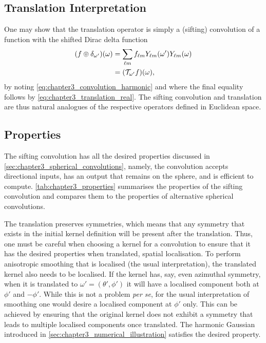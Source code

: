 \subsection{Translation Interpretation}\label{sec:chapter3_translation_interpretation}

One may show that the translation operator is simply a (sifting) convolution of a function with the shifted Dirac delta function
%
\begin{align}
	\pixel{\convolution{f}{\delta_{\omega'}}}
	 & = \harmonicSum \harmonic{f} \pixel[']{\harmonic{Y}} \pixel{\harmonic{Y}} \nonumber{} \\
	 & = \pixel{(\translation{\omega'}f)},
\end{align}
%
by noting \cref{eq:chapter3_convolution_harmonic} and where the final equality follows by \cref{eq:chapter3_translation_real}.
The sifting convolution and translation are thus natural analogues of the respective operators defined in Euclidean space.

\subsection{Properties}\label{sec:chapter3_properties}

The sifting convolution has all the desired properties discussed in \cref{sec:chapter3_spherical_convolutions}, namely, the convolution accepts directional inputs, has an output that remains on the sphere, and is efficient to compute.
\cref{tab:chapter3_properties} summarises the properties of the sifting convolution and compares them to the properties of alternative spherical convolutions.

The translation preserves symmetries, which means that any symmetry that exists in the initial kernel definition will be present after the translation.
Thus, one must be careful when choosing a kernel for a convolution to ensure that it has the desired properties when translated, \eg{} spatial localisation.
To perform anisotropic smoothing that is localised (the usual interpretation), the translated kernel also needs to be localised.
If the kernel has, say, even azimuthal symmetry, when it is translated to \(\omega'=(\theta', \phi')\) it will have a localised component both at \(\phi'\) and \(-\phi'\).
While this is not a problem \emph{per se}, for the usual interpretation of smoothing one would desire a localised component at \(\phi'\) only.
This can be achieved by ensuring that the original kernel does not exhibit a symmetry that leads to multiple localised components once translated.
The harmonic Gaussian introduced in \cref{sec:chapter3_numerical_illustration} satisfies the desired property.


